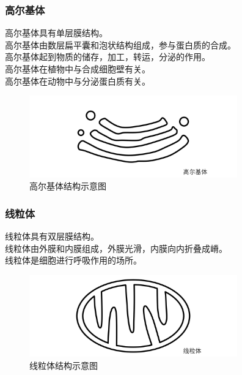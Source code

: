 \documentclass[UTF8]{ctexart}
\begin{document}
\subsubsection{高尔基体}
    高尔基体具有单层膜结构。\\[3mm]
    高尔基体由数层扁平囊和泡状结构组成，参与蛋白质的合成。\\[3mm]
    高尔基体起到物质的储存，加工，转运，分泌的作用。\\[3mm]
    高尔基体在植物中与合成细胞壁有关。\\[3mm]
    高尔基体在动物中与分泌蛋白质有关。
    \begin{figure}[h]
        \begin{center}
            \includegraphics[width=9cm]{BiologyImage/5.jpg}
            \caption{高尔基体结构示意图}
        \end{center}
    \end{figure}
    
\newpage
    
\subsubsection{线粒体}
    线粒体具有双层膜结构。\\[3mm]
    线粒体由外膜和内膜组成，外膜光滑，内膜向内折叠成嵴。\\[3mm]
    线粒体是细胞进行呼吸作用的场所。
    \begin{figure}[h]
        \begin{center}
            \includegraphics[width=9cm]{BiologyImage/7.jpg}
            \caption{线粒体结构示意图}
        \end{center}
    \end{figure}
\end{document}
